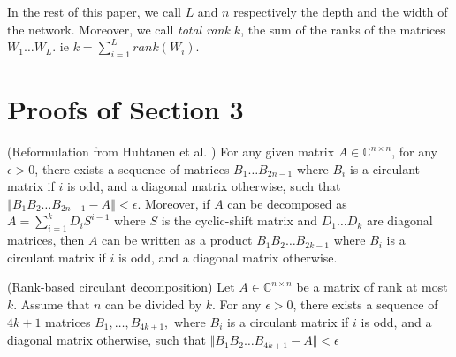 In the rest of this paper, we call $L$ and $n$ respectively the depth and the width of the network. Moreover, we call {\em total rank $k$}, the sum of the ranks of the matrices $W_{1}\ldots W_{L}$. ie $k = \sum_{i=1}^L rank(W_i)$.



\section{Proofs of Section 3}

\begin{theorem}
(Reformulation from Huhtanen et al. \cite{Huhtanen2015})\label{theorem:huhtanen-appendix}
For any given matrix $A\in\mathbb{C}^{n\times n}$, for any $\epsilon > 0$, there exists a sequence of matrices $B_1 \ldots B_{2n-1}$ where $B_{i}$ is a circulant matrix if $i$ is odd, and a diagonal matrix otherwise, such that $\left\Vert B_{1}B_{2}\ldots B_{2n-1}-A \right\Vert < \epsilon$.
Moreover, if $A$ can be decomposed as $A=\sum_{i=1}^{k}D_{i}S^{i-1}$ where $S$ is the cyclic-shift matrix and $D_{1}\ldots D_{k}$ are diagonal matrices, then $A$ can be written as a product $B_{1}B_{2}\ldots B_{2k-1}$ where $B_{i}$ is a circulant matrix if $i$ is odd, and a diagonal matrix otherwise.
\end{theorem}



\begin{theorem}(Rank-based circulant decomposition) \label{theorem:rank-decomposition-appendix}
Let $A\in\mathbb{C}^{n\times n}$ be a matrix of rank at most $k$. Assume that $n$ can be divided by $k$. For
any $\epsilon>0$, there exists a sequence of $4k+1$ matrices $B_{1},\ldots,B_{4k+1},$ where $B_{i}$ is a circulant matrix if $i$ is odd, and a diagonal matrix otherwise, such that $\Vert B_1B_2\ldots B_{4k+1} - A\Vert < \epsilon$
\end{theorem}

